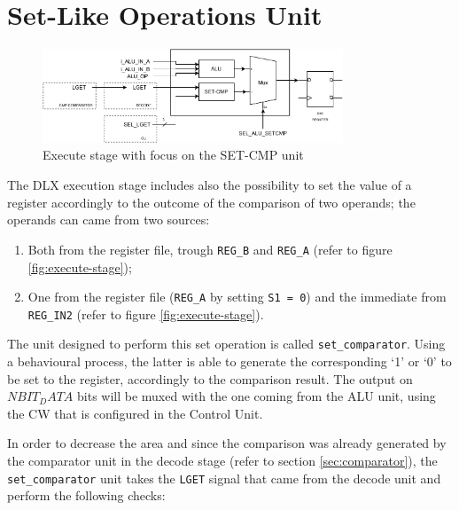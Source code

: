 \section{Set-Like Operations Unit}
\label{sec:set_like}
\begin{figure}[ht]
    \centering
    \includegraphics[width=0.8\textwidth]{chapters/5_ExecuteStage/images/set_cmp.pdf}
    \caption{Execute stage with focus on the SET-CMP unit}
    \label{fig:set-cmp}
\end{figure}

The DLX execution stage includes also the possibility to set the value of a register accordingly to the outcome of the comparison of two operands; the operands can came from two sources:
\begin{enumerate}
    \item Both from the register file, trough \texttt{REG\_B} and \texttt{REG\_A} (refer to figure \ref{fig:execute-stage});
    \item One from the register file (\texttt{REG\_A} by setting \texttt{S1 = 0}) and the immediate from \texttt{REG\_IN2} (refer to figure \ref{fig:execute-stage}).
\end{enumerate}

The unit designed to perform this set operation is called \texttt{set\_comparator}. Using a behavioural process, the latter is able to generate the corresponding `1' or `0' to be set to the register, accordingly to the comparison result. The output on $N BIT_DATA$ bits will be muxed with the one coming from the ALU unit, using the CW that is configured in the Control Unit.

In order to decrease the area and since the comparison was already generated by the comparator unit in the decode stage (refer to section \ref{sec:comparator}), the \texttt{set\_comparator} unit takes the \texttt{LGET} signal that came from the decode unit and perform the following checks:

